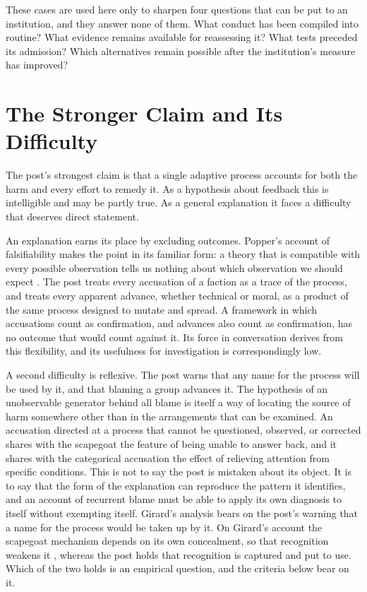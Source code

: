 \documentclass[11pt]{article}
\theoremstyle{definition}
\begin{document}
These cases are used here only to sharpen four questions that can be put to an institution, and they answer none of them. What conduct has been compiled into routine? What evidence remains available for reassessing it? What tests preceded its admission? Which alternatives remain possible after the institution's measure has improved?

\section{The Stronger Claim and Its Difficulty}

The post's strongest claim is that a single adaptive process accounts for both the harm and every effort to remedy it. As a hypothesis about feedback this is intelligible and may be partly true. As a general explanation it faces a difficulty that deserves direct statement.

An explanation earns its place by excluding outcomes. Popper's account of falsifiability makes the point in its familiar form: a theory that is compatible with every possible observation tells us nothing about which observation we should expect \cite{popper1959}. The post treats every accusation of a faction as a trace of the process, and treats every apparent advance, whether technical or moral, as a product of the same process designed to mutate and spread. A framework in which accusations count as confirmation, and advances also count as confirmation, has no outcome that would count against it. Its force in conversation derives from this flexibility, and its usefulness for investigation is correspondingly low.

A second difficulty is reflexive. The post warns that any name for the process will be used by it, and that blaming a group advances it. The hypothesis of an unobservable generator behind all blame is itself a way of locating the source of harm somewhere other than in the arrangements that can be examined. An accusation directed at a process that cannot be questioned, observed, or corrected shares with the scapegoat the feature of being unable to answer back, and it shares with the categorical accusation the effect of relieving attention from specific conditions. This is not to say the post is mistaken about its object. It is to say that the form of the explanation can reproduce the pattern it identifies, and an account of recurrent blame must be able to apply its own diagnosis to itself without exempting itself. Girard's analysis bears on the post's warning that a name for the process would be taken up by it. On Girard's account the scapegoat mechanism depends on its own concealment, so that recognition weakens it \cite{girard1986}, whereas the post holds that recognition is captured and put to use. Which of the two holds is an empirical question, and the criteria below bear on it.
\end{document}
